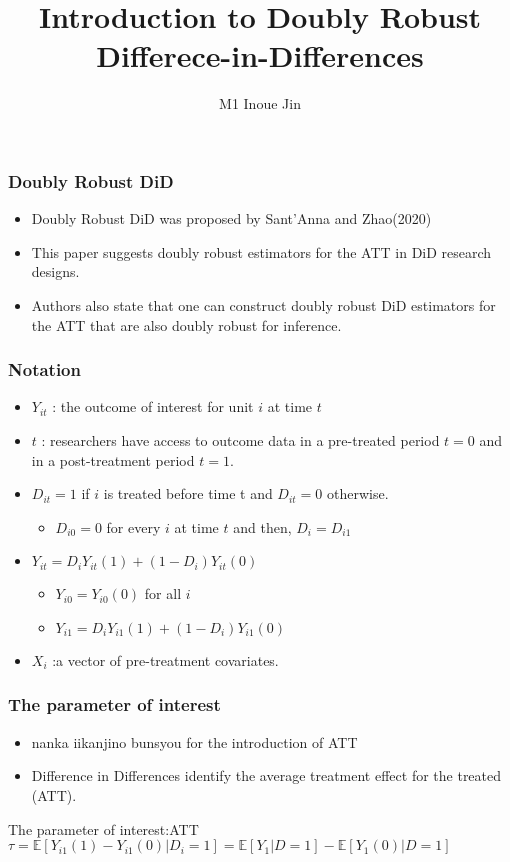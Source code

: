 \documentclass[fleqn]{beamer}
\title{Introduction to Doubly Robust Differece-in-Differences}
\author{M1 Inoue Jin}
\institute{Hitotsubashi University}
\begin{document}
\setlength{\mathindent}{0pt}

\begin{frame}
    \titlepage
\end{frame}

\begin{frame}\frametitle{Doubly Robust DiD}
    \begin{itemize}
        \item Doubly Robust DiD was proposed by Sant'Anna and Zhao(2020)
        \item This paper suggests doubly robust estimators for the ATT in DiD research designs.
        \item Authors also state that one can construct doubly robust DiD estimators for the ATT that are also doubly robust for inference.
    \end{itemize}
\end{frame}

\begin{frame}\frametitle{Notation}
    \begin{itemize}
        \item $Y_{it}$ : the outcome of interest for unit $i$ at time $t$
        \item $t$ : researchers have access to outcome data in a pre-treated period $t = 0$ and in a post-treatment period $t = 1$.
        \item $D_{it} = 1$ if $i$ is treated before time t and $D_{it} = 0$ otherwise.
        \begin{itemize}
            \item $D_{i0} = 0$ for every $i$ at time $t$ and then, $D_{i} = D_{i1}$
        \end{itemize}
        \item $Y_{it} = D_{i}Y_{it}(1) + (1 - D_{i})Y_{it}(0)$
        \begin{itemize}
            \item $Y_{i0} = Y_{i0}(0)$ for all $i$ 
            \item $Y_{i1} = D_{i}Y_{i1}(1) + (1 - D_{i})Y_{i1}(0)$ 
        \end{itemize}
        \item $X_{i}$ :a vector of pre-treatment covariates.
    \end{itemize}
\end{frame}

\begin{frame}\frametitle{The parameter of interest}
    \begin{itemize}
        \item nanka iikanjino bunsyou for the introduction of ATT
        \item Difference in Differences identify the average treatment effect for the treated (ATT). 
    \end{itemize}
    \begin{block}{The parameter of interest:ATT}
        $\tau = \mathbb{E}[Y_{i1}(1) - Y_{i1}(0)| D_{i} = 1] = \mathbb{E}[Y_{1} |D = 1] - \mathbb{E}[Y_{1}(0) | D = 1]$
    \end{block}
\end{frame}
\end{document}
